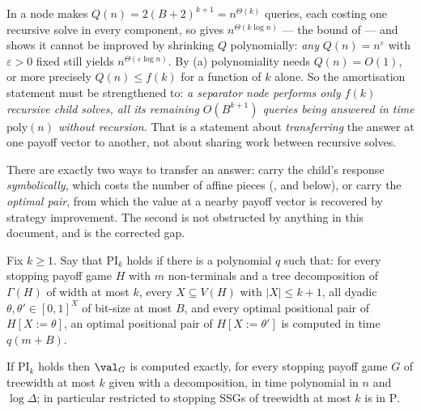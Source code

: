 \begin{remark}\label{wa:gap-corrected}
In  a node makes $Q(n)=2(B+2)^{k+1}=n^{\Theta(k)}$ queries, each
costing one recursive solve in every component, so  gives
$n^{\Theta(k\log n)}$ --- the bound of  --- and shows it cannot be
improved by shrinking $Q$ polynomially: \emph{any} $Q(n)=n^{\varepsilon}$ with
$\varepsilon>0$ fixed still yields $n^{\Theta(\varepsilon\log n)}$. By
(a) polynomiality needs $Q(n)=O(1)$, or more precisely
$Q(n)\le f(k)$ for a function of $k$ alone. So the amortisation statement must be
strengthened to: \emph{a separator node performs only $f(k)$ recursive child
solves, all its remaining $O(B^{k+1})$ queries being answered in time
$\mathrm{poly}(n)$ without recursion.} That is a statement about
\emph{transferring} the answer at one payoff vector to another, not about
sharing work between recursive solves.
\end{remark}

There are exactly two ways to transfer an answer: carry the child's response
\emph{symbolically}, which costs the number of affine pieces
(, and  below), or carry the \emph{optimal
pair}, from which the value at a nearby payoff vector is recovered by strategy
improvement. The second is not obstructed by anything in this document, and is
the corrected gap.

\begin{definition}\label{wa:pi}
Fix $k\ge1$. Say that $\mathrm{PI}_k$ holds if there is a polynomial $q$ such
that: for every stopping payoff game $H$ with $m$ non-terminals and a tree
decomposition of $\Gamma(H)$ of width at most $k$, every $X\subseteq V(H)$ with
$|X|\le k+1$, all dyadic $\theta,\theta'\in[0,1]^{X}$ of bit-size at most $B$,
and every optimal positional pair of $H[X{:=}\theta]$, an optimal positional
pair of $H[X{:=}\theta']$ is computed in time $q(m+B)$.
\end{definition}

\begin{theorem}\label{wa:amortised}
If $\mathrm{PI}_k$ holds then $\val_G$ is computed exactly, for every stopping
payoff game $G$ of treewidth at most $k$ given with a decomposition, in time
polynomial in $n$ and $\log\Delta$; in particular  restricted to
stopping SSGs of treewidth at most $k$ is in $\mathrm P$.
\end{theorem}

